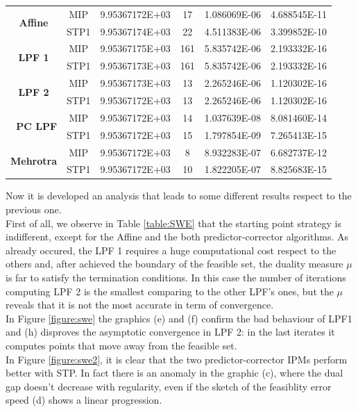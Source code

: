 \documentclass[a4paper,10 pt,titlepage,twoside]{report}
\theoremstyle{plain}
\theoremstyle{definition}
\theoremstyle{remark}
\begin{document}
{{\begin{table}[t]
\begin{tabular}{cclcll}
		\multicolumn{1}{c|}{\multirow{2}{*}{\textbf{Affine}}} & MIP & 9.95367172E+03 & 17 & 1.086069E-06 & 4.688545E-11 \\
		\multicolumn{1}{c|}{} & STP1 & 9.95367174E+03 & 22 & 4.511383E-06 & 3.399852E-10 \\ \hline
		\multicolumn{1}{c|}{\multirow{2}{*}{\textbf{LPF 1}}} & MIP & 9.95367175E+03 & 161 & 5.835742E-06 & 2.193332E-16 \\
		\multicolumn{1}{c|}{} & STP1 & 9.95367173E+03 & 161 & 5.835742E-06 & 2.193332E-16 \\ \hline
		\multicolumn{1}{c|}{\multirow{2}{*}{\textbf{LPF 2}}} & MIP & 9.95367173E+03 & 13 & 2.265246E-06 & 1.120302E-16 \\
		\multicolumn{1}{c|}{} & STP1 & 9.95367172E+03 & 13 & 2.265246E-06 & 1.120302E-16 \\ \hline
		\multicolumn{1}{r|}{\multirow{2}{*}{\textbf{PC LPF}}} & MIP & 9.95367172E+03 & 14 & 1.037639E-08 & 8.081460E-14 \\
		\multicolumn{1}{r|}{} & STP1 & 9.95367172E+03 & 15 & 1.797854E-09 & 7.265413E-15 \\ \hline
		\multicolumn{1}{c|}{\multirow{2}{*}{\textbf{Mehrotra}}} & MIP & 9.95367172E+03 & 8 & 8.932283E-07 & 6.682737E-12 \\
		\multicolumn{1}{c|}{} & STP1 & 9.95367172E+03 & 10 & 1.822205E-07 & 8.825683E-15 \\ \hline
	\end{tabular}
\end{table}
Now it is developed an analysis that leads to 
some different results respect to the previous one. \\First of all, we observe in Table \ref{table:SWE} that the starting point strategy is indifferent, except for the Affine and the both predictor-corrector algorithms. As already occured, the LPF 1 requires a huge computational cost respect to the others and, after achieved the boundary of the feasible set, the duality measure $\mu$ is far to satisfy the termination conditions. In this case the number of iterations computing LPF 2 is the smallest comparing to the other LPF's ones, but the $\mu$ reveals that it is not the most accurate in term of convergence.\\
In Figure \ref{figure:swe} the graphics (e) and (f) confirm the bad behaviour of LPF1 and (h) disproves the asymptotic convergence in LPF 2: in the last iterates it computes points that move away from the feasible set.\\
In Figure \ref{figure:swe2}, it is clear that the two predictor-corrector IPMs perform better with STP. In fact there is an anomaly in the graphic (c), where the dual gap doesn't decrease with regularity, even if the sketch of the feasiblity error speed (d) shows a linear progression. \\
}}
\end{document}
